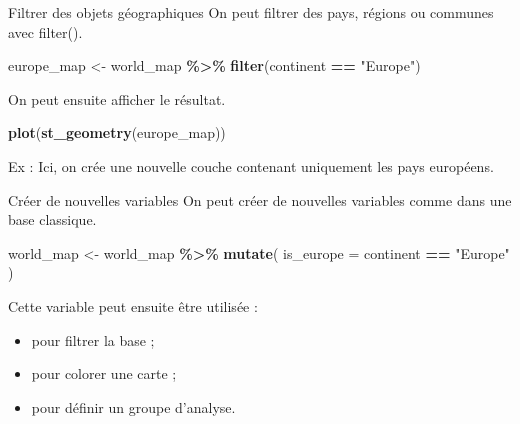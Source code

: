 \documentclass[
  10pt,
  ignorenonframetext,
]{beamer}
\newenvironment{Shaded}{\begin{snugshade}}{\end{snugshade}}
\newcommand{\AttributeTok}[1]{\textcolor[rgb]{0.13,0.29,0.53}{#1}}
\newcommand{\FunctionTok}[1]{\textcolor[rgb]{0.13,0.29,0.53}{\textbf{#1}}}
\newcommand{\NormalTok}[1]{#1}
\newcommand{\OtherTok}[1]{\textcolor[rgb]{0.56,0.35,0.01}{#1}}
\newcommand{\SpecialCharTok}[1]{\textcolor[rgb]{0.81,0.36,0.00}{\textbf{#1}}}
\newcommand{\StringTok}[1]{\textcolor[rgb]{0.31,0.60,0.02}{#1}}
\begin{document}
\begin{frame}[fragile]{Filtrer des objets géographiques}
\label{filtrer-des-objets-guxe9ographiques}
On peut filtrer des pays, régions ou communes avec filter().

\begin{Shaded}
\begin{Highlighting}[]
\NormalTok{europe\_map }\OtherTok{\textless{}{-}}\NormalTok{ world\_map }\SpecialCharTok{\%\textgreater{}\%}
  \FunctionTok{filter}\NormalTok{(continent }\SpecialCharTok{==} \StringTok{"Europe"}\NormalTok{)}
\end{Highlighting}
\end{Shaded}

On peut ensuite afficher le résultat.

\begin{Shaded}
\begin{Highlighting}[]
\FunctionTok{plot}\NormalTok{(}\FunctionTok{st\_geometry}\NormalTok{(europe\_map))}
\end{Highlighting}
\end{Shaded}

Ex : Ici, on crée une nouvelle couche contenant uniquement les pays
européens.
\end{frame}

\begin{frame}[fragile]{Créer de nouvelles variables}
\label{cruxe9er-de-nouvelles-variables}
On peut créer de nouvelles variables comme dans une base classique.

\begin{Shaded}
\begin{Highlighting}[]
\NormalTok{world\_map }\OtherTok{\textless{}{-}}\NormalTok{ world\_map }\SpecialCharTok{\%\textgreater{}\%}
  \FunctionTok{mutate}\NormalTok{(}
    \AttributeTok{is\_europe =}\NormalTok{ continent }\SpecialCharTok{==} \StringTok{"Europe"}
\NormalTok{  )}
\end{Highlighting}
\end{Shaded}

Cette variable peut ensuite être utilisée :

\begin{itemize}
\item pour filtrer la base ;
\item pour colorer une carte ;
\item pour définir un groupe d’analyse.
\end{itemize}
\end{frame}
\end{document}
